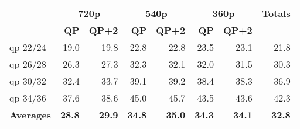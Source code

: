 \begin{table}[htbp]
{\begin{tabular}{l|rr|rr|rr|r}
       & \multicolumn{2}{c|}{\textbf{720p}} & \multicolumn{2}{c|}{\textbf{540p}} & \multicolumn{2}{c|}{\textbf{360p}} & \multicolumn{1}{c}{\textbf{Totals}} \\
       & \textbf{QP} & \textbf{QP+2} & \textbf{QP} & \textbf{QP+2} & \textbf{QP} & \textbf{QP+2} &  \\
    qp 22/24 & 19.0 & 19.8 & 22.8 & 22.8 & 23.5 & 23.1 & 21.8 \\
    qp 26/28 & 26.3 & 27.3 & 32.3 & 32.1 & 32.0 & 31.5 & 30.3 \\
    qp 30/32 & 32.4 & 33.7 & 39.1 & 39.2 & 38.4 & 38.3 & 36.9 \\
    qp 34/36 & 37.6 & 38.6 & 45.0 & 45.7 & 43.5 & 43.6 & 42.3 \\
    \textbf{Averages} & \textbf{28.8} & \textbf{29.9} & \textbf{34.8} & \textbf{35.0} & \textbf{34.3} & \textbf{34.1} & \textbf{32.8} \\
    \bottomrule
    \end{tabular}%
  }
  \label{tab:sbh0_pruning_rdoq0_pp_l1}%
\end{table}%
